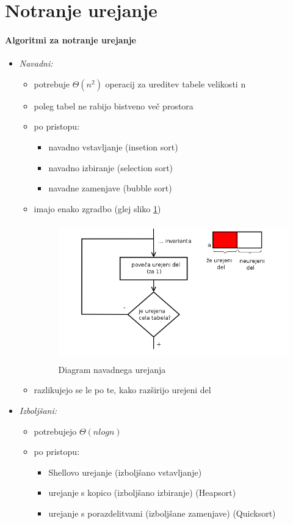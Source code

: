 \documentclass[a4paper,10pt]{article}
\begin{document}
\section{Notranje urejanje}

\paragraph*{Algoritmi za notranje urejanje}

\begin{itemize}
\item \emph{Navadni:}
	\begin{itemize}
	\item potrebuje $\Theta (n^2)$ operacij za ureditev tabele velikosti n
	\item poleg tabel ne rabijo bistveno ve\v{c} prostora
	\item po pristopu:
		\begin{itemize}
		\item navadno vstavljanje (insetion sort)
		\item navadno izbiranje (selection sort)
		\item navadne zamenjave (bubble sort)
		\end{itemize}
	\item imajo enako zgradbo (glej sliko \ref{Diagram navadnega urejanja})
	\begin{figure}[hbt]
		\includegraphics[width=10.7cm,height=5.95cm]{Slike/DiagramUrejanja.png}
		\caption{Diagram navadnega urejanja}
		\label{Diagram navadnega urejanja}
	\end{figure}
	\item razlikujejo se le po te, kako raz\v{s}irijo urejeni del
	\end{itemize}
\item \emph{Izbolj\v{s}ani:}
	\begin{itemize}
	\item potrebujejo $\Theta (n log n)$
	\item po pristopu:
		\begin{itemize}
		\item Shellovo urejanje (izbolj\v{s}ano vstavljanje)
		\item urejanje s kopico (izbolj\v{s}ano izbiranje) (Heapsort)
		\item urejanje s porazdelitvami (izbolj\v{s}ane zamenjave) (Quicksort)
		\end{itemize}
	\end{itemize}
\end{itemize}
\end{document}
